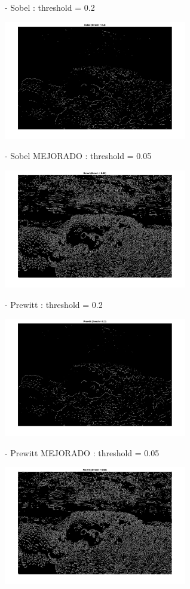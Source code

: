 \documentclass{article}
\begin{document}
\begin{enumerate}
\begin{enumerate}
   - Sobel : threshold = 0.2
 
 \begin{center}
 \includegraphics[width=0.6\textwidth]{3b(sobel).png}
 \end{center}
 
 - Sobel MEJORADO : threshold = 0.05
 
 \begin{center}
 \includegraphics[width=0.6\textwidth]{3b(sobel_best).png}
 \end{center}
 
 \newpage
 
 - Prewitt : threshold = 0.2
 
 \begin{center}
 \includegraphics[width=0.6\textwidth]{3b(prewitt).png}
 \end{center} 
 
 - Prewitt MEJORADO : threshold = 0.05
 
 \begin{center}
 \includegraphics[width=0.6\textwidth]{3b(prewitt_best).png}
 \end{center}
 

\end{enumerate}
\end{enumerate}
\end{document}

